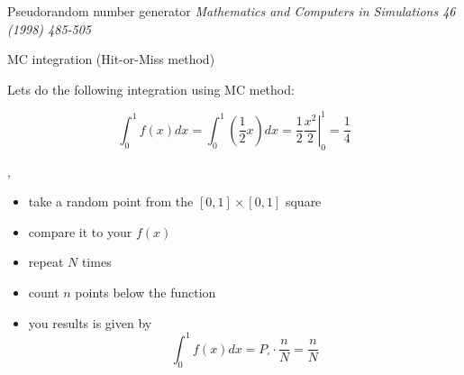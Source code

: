 \begin{slide}[toc=]{Pseudorandom number generator}
{  }
  {\it\color{pdcolor3}Mathematics and Computers in Simulations 46 (1998) 485-505}
\vfill\null
\end{slide}

\begin{slide}[toc=Hit-or-Miss method]{MC integration (Hit-or-Miss method)}
\null\vfill

  Lets do the following integration using MC method:
  
  $$\int_0^1 f(x)dx = \int_0^1 \left(\frac{1}{2}x\right) dx = \left.\frac{1}{2}\frac{x^2}{2}\right|_{0}^{1} = \frac{1}{4}$$

  \twocolumn
  {
    \sep
    \begin{itemize}
     \item take a random point from the $[0,1]\times[0,1]$ square
     \item compare it to your $f(x)$
     \item repeat $N$ times
     \item count $n$ points below the function
     \item you results is given by
     $$\int_0^1 f(x)dx = P_{\square} \cdot \frac{n}{N} = \frac{n}{N}$$
    \end{itemize}
  }
  {
    
  }
  
\vfill\null
\end{slide}


